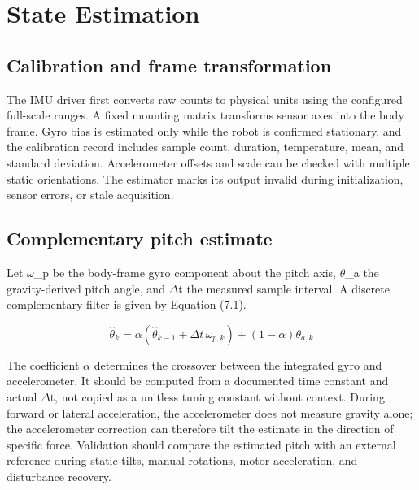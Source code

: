 \section{State Estimation}\label{state-estimation}

\subsection{Calibration and frame transformation}\label{calibration-and-frame-transformation}

The IMU driver first converts raw counts to physical units using the
configured full-scale ranges. A fixed mounting matrix transforms sensor
axes into the body frame. Gyro bias is estimated only while the robot is
confirmed stationary, and the calibration record includes sample count,
duration, temperature, mean, and standard deviation. Accelerometer
offsets and scale can be checked with multiple static orientations. The
estimator marks its output invalid during initialization, sensor errors,
or stale acquisition.

\subsection{Complementary pitch estimate}\label{complementary-pitch-estimate}

Let \ensuremath{\omega}\_p be the body-frame gyro component about the pitch axis, \ensuremath{\theta}\_a the
gravity-derived pitch angle, and \ensuremath{\Delta}t the measured sample interval. A
discrete complementary filter is given by Equation (7.1).

\begin{equation}
\hat{\theta}_{k}=\alpha\left(\hat{\theta}_{k-1}+\Delta t\,\omega_{p,k}\right)
+(1-\alpha)\theta_{a,k}
\label{eq:7-1}
\end{equation}

The coefficient \ensuremath{\alpha} determines the crossover between the integrated gyro
and accelerometer. It should be computed from a documented time constant
and actual \ensuremath{\Delta}t, not copied as a unitless tuning constant without context.
During forward or lateral acceleration, the accelerometer does not
measure gravity alone; the accelerometer correction can therefore tilt
the estimate in the direction of specific force. Validation should
compare the estimated pitch with an external reference during static
tilts, manual rotations, motor acceleration, and disturbance recovery.

